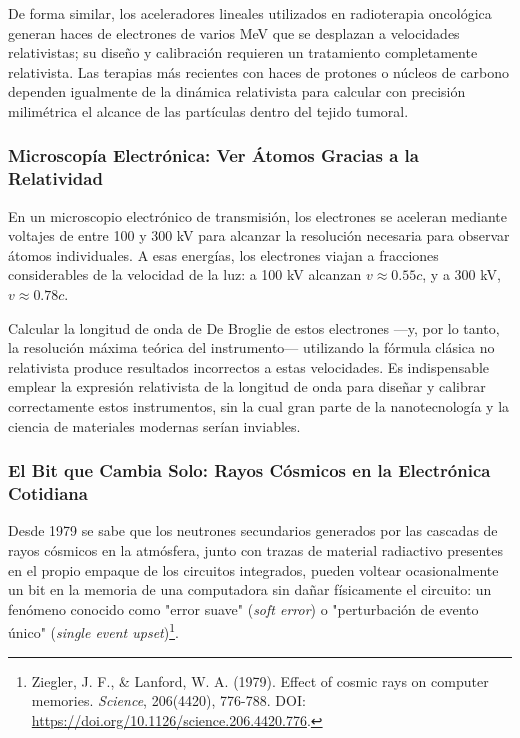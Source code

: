 \documentclass[11pt,a4paper]{book}
\begin{document}
De forma similar, los aceleradores lineales utilizados en radioterapia oncológica generan haces
de electrones de varios MeV que se desplazan a velocidades relativistas; su diseño y calibración
requieren un tratamiento completamente relativista. Las terapias más recientes con haces de
protones o núcleos de carbono dependen igualmente de la dinámica relativista para calcular con
precisión milimétrica el alcance de las partículas dentro del tejido tumoral.

\subsubsection{Microscopía Electrónica: Ver Átomos Gracias a la Relatividad}

En un microscopio electrónico de transmisión, los electrones se aceleran mediante voltajes de
entre 100 y 300 kV para alcanzar la resolución necesaria para observar átomos individuales. A
esas energías, los electrones viajan a fracciones considerables de la velocidad de la luz: a
100 kV alcanzan $v \approx 0.55c$, y a 300 kV, $v \approx 0.78c$.

Calcular la longitud de onda de De Broglie de estos electrones —y, por lo tanto, la resolución
máxima teórica del instrumento— utilizando la fórmula clásica no relativista produce resultados
incorrectos a estas velocidades. Es indispensable emplear la expresión relativista de la
longitud de onda para diseñar y calibrar correctamente estos instrumentos, sin la cual gran
parte de la nanotecnología y la ciencia de materiales modernas serían inviables.

\subsubsection{El Bit que Cambia Solo: Rayos Cósmicos en la Electrónica Cotidiana}

Desde 1979 se sabe que los neutrones secundarios generados por las cascadas de rayos cósmicos en
la atmósfera, junto con trazas de material radiactivo presentes en el propio empaque de los
circuitos integrados, pueden voltear ocasionalmente un bit en la memoria de una computadora sin
dañar físicamente el circuito: un fenómeno conocido como "error suave" (\emph{soft error}) o
"perturbación de evento único" (\emph{single event upset})\footnote{Ziegler, J. F., \& Lanford, W. A. (1979). Effect of cosmic rays on computer memories. \emph{Science}, 206(4420), 776-788. DOI: \url{https://doi.org/10.1126/science.206.4420.776}.}.
\end{document}
